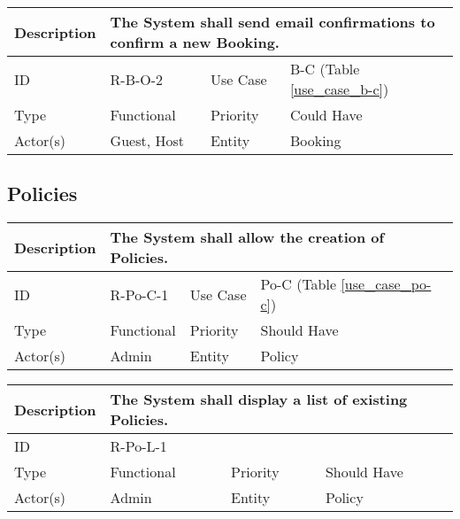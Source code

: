 \begin{tabular}{|p{1.5cm}|p{1.5cm}|p{1.5cm}|p{1.5cm}|p{1.5cm}|p{1.5cm}|p{1.5cm}|p{1.5cm}|p{1.5cm}|p{1.5cm}|p{1.5cm}|p{1.5cm}|}
    \hline
    \multicolumn{2}{|o|}{Description} & \multicolumn{10}{p{12.5cm}|}{The System shall send email confirmations to confirm a new Booking.} \\ \hline
    \multicolumn{2}{|o|}{ID}          & \multicolumn{4}{n}{R-B-O-2}  & \multicolumn{2}{|o|}{Use Case}    & \multicolumn{4}{n|}{B-C (Table \ref{use_case_b-c})}    \\ \hline
    \multicolumn{2}{|o|}{Type}        & \multicolumn{4}{n}{Functional}         & \multicolumn{2}{|o|}{Priority}    & \multicolumn{4}{n|}{Could Have}  \\ \hline
    \multicolumn{2}{|o|}{Actor(s)}    & \multicolumn{4}{n}{Guest, Host}        & \multicolumn{2}{|o|}{Entity}      & \multicolumn{4}{n|}{Booking} \\ \hline
\end{tabular}

\subsection{Policies}

\begin{tabular}{|p{1.5cm}|p{1.5cm}|p{1.5cm}|p{1.5cm}|p{1.5cm}|p{1.5cm}|p{1.5cm}|p{1.5cm}|p{1.5cm}|p{1.5cm}|p{1.5cm}|p{1.5cm}|}
    \hline
    \multicolumn{2}{|o|}{Description} & \multicolumn{10}{p{12.5cm}|}{The System shall allow the creation of Policies.} \\ \hline
    \multicolumn{2}{|o|}{ID}          & \multicolumn{4}{n}{R-Po-C-1}           & \multicolumn{2}{|o|}{Use Case}    & \multicolumn{4}{n|}{Po-C (Table \ref{use_case_po-c})} \\ \hline
    \multicolumn{2}{|o|}{Type}        & \multicolumn{4}{n}{Functional}         & \multicolumn{2}{|o|}{Priority}    & \multicolumn{4}{n|}{Should Have}  \\ \hline
    \multicolumn{2}{|o|}{Actor(s)}    & \multicolumn{4}{n}{Admin}              & \multicolumn{2}{|o|}{Entity}      & \multicolumn{4}{n|}{Policy} \\ \hline
\end{tabular}

\begin{tabular}{|p{1.5cm}|p{1.5cm}|p{1.5cm}|p{1.5cm}|p{1.5cm}|p{1.5cm}|p{1.5cm}|p{1.5cm}|p{1.5cm}|p{1.5cm}|p{1.5cm}|p{1.5cm}|}
    \hline
    \multicolumn{2}{|o|}{Description} & \multicolumn{10}{p{12.5cm}|}{The System shall display a list of existing Policies.} \\ \hline
    \multicolumn{2}{|o|}{ID}          & \multicolumn{10}{p{12.5cm}|}{R-Po-L-1}             \\ \hline
    \multicolumn{2}{|o|}{Type}        & \multicolumn{4}{n}{Functional}         & \multicolumn{2}{|o|}{Priority}    & \multicolumn{4}{n|}{Should Have}  \\ \hline
    \multicolumn{2}{|o|}{Actor(s)}    & \multicolumn{4}{n}{Admin}              & \multicolumn{2}{|o|}{Entity}      & \multicolumn{4}{n|}{Policy} \\ \hline
\end{tabular}

